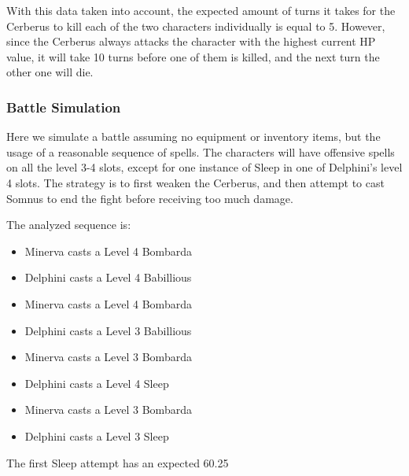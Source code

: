 With this data taken into account, the expected amount of turns it takes for the Cerberus to kill each of the two characters individually is equal to 5. However, since the Cerberus always attacks the character with the highest current HP value, it will take 10 turns before one of them is killed, and the next turn the other one will die.

\subsubsection{Battle Simulation}
Here we simulate a battle assuming no equipment or inventory items, but the usage of a reasonable sequence of spells.
The characters will have offensive spells on all the level 3-4 slots, except for one instance of Sleep in one of Delphini's level 4 slots. The strategy is to first weaken the Cerberus, and then attempt to cast Somnus to end the fight before receiving too much damage.

The analyzed sequence is: \\
\begin{itemize}
	\item Minerva casts a Level 4 Bombarda
	\item Delphini casts a Level 4 Babillious
	\item Minerva casts a Level 4 Bombarda
	\item Delphini casts a Level 3 Babillious
	\item Minerva casts a Level 3 Bombarda
	\item Delphini casts a Level 4 Sleep
	\item Minerva casts a Level 3 Bombarda
	\item Delphini casts a Level 3 Sleep
\end{itemize}

The first Sleep attempt has an expected 60.25%

